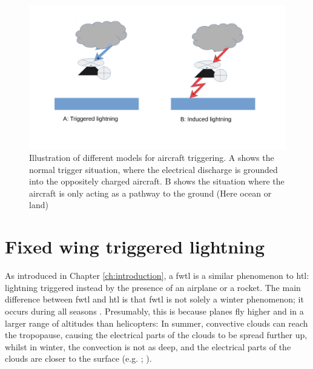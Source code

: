 \begin{figure}
    \centering
    \includegraphics[width=\textwidth]{Figures/triggertyper.pdf}
    \caption{Illustration of different models for aircraft triggering. A shows the normal trigger situation, where the electrical discharge is grounded into the oppositely charged aircraft. B shows the situation where the aircraft is only acting as a pathway to the ground (Here ocean or land)}
    \label{fig:triggertyper}
\end{figure}

\section{Fixed wing triggered lightning}\label{sec:fwtl}

As introduced in Chapter \ref{ch:introduction}, a \acrfull{fwtl} is a similar phenomenon to \acrshort{htl}: lightning triggered instead by the presence of an airplane or a rocket. The main difference between \acrshort{fwtl} and \acrshort{htl} is that \acrshort{fwtl} is not solely a winter phenomenon; it occurs during all seasons \cite{uman2003}. Presumably, this is because planes fly higher and in a larger range of altitudes than helicopters: In summer, convective clouds can reach the tropopause, causing the electrical parts of the clouds to be spread further up, whilst in winter, the convection is not as deep, and the electrical parts of the clouds are closer to the surface (e.g. \cite{uman2003}; \cite{michimoto2007}).

